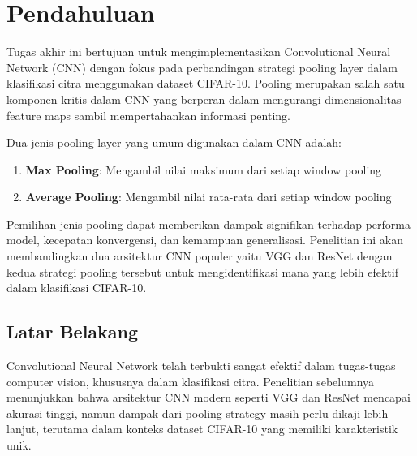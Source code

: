\documentclass[12pt,a4paper]{report}
\begin{document}
\vfill

\newpage
\thispagestyle{empty}

\tableofcontents

\newpage

\setcounter{page}{1}

\chapter{Pendahuluan}

Tugas akhir ini bertujuan untuk mengimplementasikan Convolutional Neural Network (CNN) dengan fokus pada perbandingan strategi pooling layer dalam klasifikasi citra menggunakan dataset CIFAR-10. Pooling merupakan salah satu komponen kritis dalam CNN yang berperan dalam mengurangi dimensionalitas feature maps sambil mempertahankan informasi penting.

Dua jenis pooling layer yang umum digunakan dalam CNN adalah:
\begin{enumerate}
    \item \textbf{Max Pooling}: Mengambil nilai maksimum dari setiap window pooling
    \item \textbf{Average Pooling}: Mengambil nilai rata-rata dari setiap window pooling
\end{enumerate}

Pemilihan jenis pooling dapat memberikan dampak signifikan terhadap performa model, kecepatan konvergensi, dan kemampuan generalisasi. Penelitian ini akan membandingkan dua arsitektur CNN populer yaitu VGG dan ResNet dengan kedua strategi pooling tersebut untuk mengidentifikasi mana yang lebih efektif dalam klasifikasi CIFAR-10.

\section{Latar Belakang}

Convolutional Neural Network telah terbukti sangat efektif dalam tugas-tugas computer vision, khususnya dalam klasifikasi citra. Penelitian sebelumnya menunjukkan bahwa arsitektur CNN modern seperti VGG dan ResNet mencapai akurasi tinggi, namun dampak dari pooling strategy masih perlu dikaji lebih lanjut, terutama dalam konteks dataset CIFAR-10 yang memiliki karakteristik unik.
\end{document}
